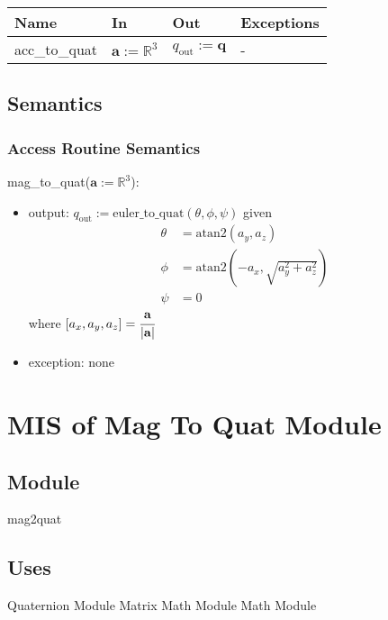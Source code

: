 \documentclass[12pt, titlepage]{article}
\begin{document}
\begin{center}
\begin{tabular}{p{2cm} p{4cm} p{4cm} p{2cm}}
\hline
\textbf{Name} & \textbf{In} & \textbf{Out} & \textbf{Exceptions} \\
\hline
acc\_to\_quat & $\mathbf{a}:=\mathbb{R}^3$ & $q_\text{out} := \mathbf{q}$ & - \\
\hline
\end{tabular}
\end{center}

\subsection{Semantics}

\subsubsection{Access Routine Semantics}

\noindent mag\_to\_quat($\mathbf{a}:=\mathbb{R}^3$):
\begin{itemize}
\item output: $q_\text{out}:= \text{euler\_to\_quat}(\theta, \phi, \psi)$ given
\begin{align*}
  \theta &= \text{atan2}(a_y, a_z) \\
  \phi &= \text{atan2}(-a_x, \sqrt{a_y^2+a_z^2}) \\
  \psi &= 0
\end{align*}
where $[a_x, a_y, a_z] = \cfrac{\mathbf{a}}{|\mathbf{a}|}$
\item exception: none
\end{itemize}

\newpage

\section{MIS of Mag To Quat Module} \label{iqewmm}

\subsection{Module}
mag2quat

\subsection{Uses}
Quaternion Module \newline
Matrix Math Module \newline
Math Module
\end{document}
